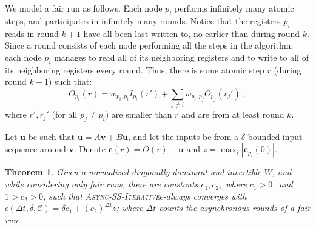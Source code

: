 \documentclass[preprint,12pt]{elsarticle}
\newtheorem{theorem}{Theorem}
\newcommand\C{\mathcal{C}}
\newcommand{\asyncAlg}{\textsc{Async-SS-Iterative}\xspace}
\newcommand{\uu}{\mathbf{u}}
\newcommand{\vv}{\mathbf{v}}
\newcommand{\cc}{\mathbf{c}}
\newcommand{\Or}[1]{O(#1)}
\newcommand{\II}[2]{I_{#1}(#2)}
\newcommand{\OO}[2]{O_{#1}(#2)}
\begin{document}
We model a fair run as follows. Each node $p_i$ performs
infinitely many atomic steps, and participates in infinitely many
rounds. Notice that the registers $p_i$ reads in round $k+1$ have
all been last written to, no earlier than during round $k$. Since a
round consists of each node performing all the steps in the
algorithm, each node $p_i$ manages to read all of its neighboring
registers and to write to all of its neighboring registers every
round. Thus, there is some atomic step $r$ (during round $k+1$)
such that:
\begin{equation*}
  \OO{p_i}{r} =
  w_{p_i,p_i} \II{p_i}{r'} + \sum_{j \neq i}w_{p_i, p_j}
   \OO{p_j}{r_j'}\;,
\end{equation*}
where $r', r_j'$ (for all $p_j \neq p_i$) are smaller
than $r$ and are from at least round $k$.

Let $\uu$ be such that $\uu = A\vv + B\uu$, and let the inputs be
from a $\delta$-bounded input sequence around $\vv$. Denote $\cc(r) = \Or{r} - \uu$ and $z = \max_i |\cc_{p_i}(0)|$.

\begin{theorem}\label{theorem:main2}
  Given a normalized diagonally dominant and invertible $W$, and while considering only fair runs,
  there are constants $c_1,c_2,$ where $c_1 > 0,$ and $ 1 > c_2 > 0$,
  such that \asyncAlg $\epsilon$-always converges with
  $\epsilon(\Delta t, \delta, \C) = \delta  c_1 + (c_2)^{\Delta t}  z$; where $\Delta t$ counts the asynchronous rounds of a fair run.
\end{theorem}
\end{document}

